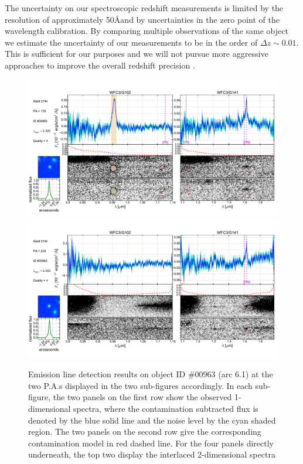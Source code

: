 The uncertainty on our spectroscopic redshift measurements is limited
by the resolution of approximately 50\AA and by uncertainties in the
zero point of the wavelength calibration. By comparing multiple
observations of the same object we estimate the uncertainty of our
measurements to be in the order of $\Delta z\sim 0.01$. This is
sufficient for our purposes and we will not pursue more aggressive
approaches to improve the overall redshift precision
\citep[e.g.][]{Brammer:2012p12977}.

\begin{figure}
    \centering
    \includegraphics[width=.8\textwidth]{fig/clA2744_id963_pa135_zsQ4.pdf}\\
    \includegraphics[width=.8\textwidth]{fig/clA2744_id963_pa233_zsQ4.pdf}
    \caption[Emission line detection results on object ID \#00963 (arc 6.1).]{Emission line detection results on object ID \#00963 (arc 6.1) at the two P.A.s displayed in the two
    sub-figures accordingly. In each sub-figure, the two panels on the first row show the observed 1-dimensional
    spectra, where the contamination subtracted flux is denoted by the blue solid line and the noise level by the
    cyan shaded region. The two panels on the second row give the corresponding contamination model in red dashed
    line. For the four panels directly underneath, the top two display the interlaced 2-dimensional spectra
}
\end{figure}
